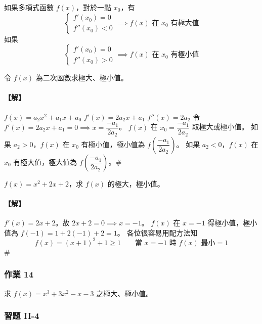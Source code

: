 \begin{theorem}[極值判別法]\label{thm:b6-2-extrema}
如果多項式函數 $f(x)$，對於一點 $x_0$，有
\[ \begin{cases} f'(x_0) = 0 \\ f''(x_0) < 0 \end{cases} \implies f(x) \text{ 在 } x_0 \text{ 有極大值} \]
如果
\[ \begin{cases} f'(x_0) = 0 \\ f''(x_0) > 0 \end{cases} \implies f(x) \text{ 在 } x_0 \text{ 有極小值} \]
\end{theorem}

\begin{example}\label{ex:b6-2-22}
令 $f(x)$ 為二次函數求極大、極小值。
\end{example}

\paragraph{【解】}
$f(x) = a_2 x^2 + a_1 x + a_0$
$f'(x) = 2a_2 x + a_1$
$f''(x) = 2a_2$
令 $f'(x) = 2a_2 x + a_1 = 0 \implies x = \dfrac{-a_1}{2a_2}$。
$f(x)$ 在 $x_0 = \dfrac{-a_1}{2a_2}$ 取極大或極小值。
如果 $a_2 > 0$，$f(x)$ 在 $x_0$ 有極小值，極小值為 $f\left(\dfrac{-a_1}{2a_2}\right)$。
如果 $a_2 < 0$，$f(x)$ 在 $x_0$ 有極大值，極大值為 $f\left(\dfrac{-a_1}{2a_2}\right)$。\hfill$\#$

\begin{example}\label{ex:b6-2-23}
$f(x)=x^2+2x+2$，求 $f(x)$ 的極大，極小值。
\end{example}

\paragraph{【解】}
$f'(x)=2x+2$。故 $2x+2=0 \implies x=-1$。
$f(x)$ 在 $x=-1$ 得極小值，極小值為 $f(-1)=1+2(-1)+2=1$。
各位很容易用配方法知
\[ f(x) = (x+1)^2+1 \ge 1 \qquad \text{當 } x=-1 \text{ 時 } f(x) \text{ 最小}=1 \]\hfill$\#$

\subsubsection*{作業 14}\label{hw:b6-2-14}
求 $f(x)=x^3+3x^2-x-3$ 之極大、極小值。

\subsubsection*{習題 II-4}\label{sec:b6-ex2-4}

